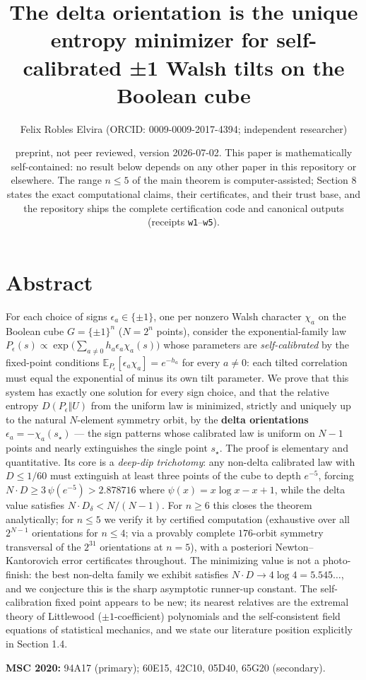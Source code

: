 \documentclass[11pt]{article}
\title{The delta orientation is the unique entropy minimizer for self-calibrated ±1 Walsh tilts on the Boolean cube}
\author{Felix Robles Elvira (ORCID: 0009-0009-2017-4394; independent researcher)}
\date{\small preprint, not peer reviewed, version 2026-07-02.  This paper is mathematically self-contained: no result below depends on any other paper in this repository or elsewhere.  The range $n \le 5$ of the main theorem is computer-assisted; Section 8 states the exact computational claims, their certificates, and their trust base, and the repository ships the complete certification code and canonical outputs (receipts \texttt{w1}–\texttt{w5}).}
\begin{document}
\maketitle

\section*{Abstract}
For each choice of signs $\epsilon_a \in \{\pm 1\}$, one per nonzero Walsh character $\chi_a$ on the Boolean cube $G = \{\pm1\}^n$ ($N = 2^n$ points), consider the exponential-family law $P_\epsilon(s) \propto \exp\big(\sum_{a \ne 0} h_a \epsilon_a \chi_a(s)\big)$ whose parameters are \emph{self-calibrated} by the fixed-point conditions $\mathbb{E}_{P_\epsilon}[\epsilon_a \chi_a] = e^{-h_a}$ for every $a \ne 0$: each tilted correlation must equal the exponential of minus its own tilt parameter.  We prove that this system has exactly one solution for every sign choice, and that the relative entropy $D(P_\epsilon \Vert U)$ from the uniform law is minimized, strictly and uniquely up to the natural $N$-element symmetry orbit, by the \textbf{delta orientations} $\epsilon_a = -\chi_a(s_\star)$ — the sign patterns whose calibrated law is uniform on $N-1$ points and nearly extinguishes the single point $s_\star$.  The proof is elementary and quantitative.  Its core is a \emph{deep-dip trichotomy}: any non-delta calibrated law with $D \le 1/60$ must extinguish at least three points of the cube to depth $e^{-5}$, forcing $N \cdot D \ge 3\,\psi(e^{-5}) > 2.878716$ where $\psi(x) = x\log x - x + 1$, while the delta value satisfies $N \cdot D_\delta < N/(N-1)$.  For $n \ge 6$ this closes the theorem analytically; for $n \le 5$ we verify it by certified computation (exhaustive over all $2^{N-1}$ orientations for $n \le 4$; via a provably complete $176$-orbit symmetry transversal of the $2^{31}$ orientations at $n = 5$), with a posteriori Newton–Kantorovich error certificates throughout.  The minimizing value is not a photo-finish: the best non-delta family we exhibit satisfies $N \cdot D \to 4\log 4 = 5.545\ldots$, and we conjecture this is the sharp asymptotic runner-up constant.  The self-calibration fixed point appears to be new; its nearest relatives are the extremal theory of Littlewood ($\pm1$-coefficient) polynomials and the self-consistent field equations of statistical mechanics, and we state our literature position explicitly in Section 1.4.

\textbf{MSC 2020:} 94A17 (primary); 60E15, 42C10, 05D40, 65G20 (secondary).
\end{document}
